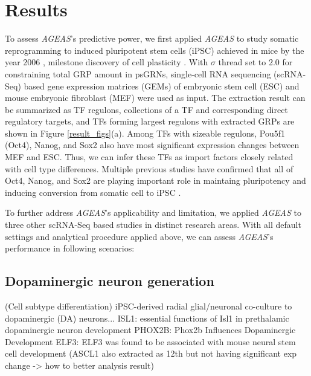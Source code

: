 \documentclass[fleqn,10pt]{wlscirep}
\begin{document}
\section*{Results}
  \label{res}
  To assess \emph{AGEAS}'s predictive power, we first applied \emph{AGEAS} to study somatic reprogramming to induced pluripotent stem cells (iPSC) achieved in mice by
  the year 2006 \cite{yamanaka_2006}, milestone discovery of cell plasticity \cite{cell_repro_review}.
  With $\sigma$ thread set to 2.0 for constraining total GRP amount in psGRNs, single-cell RNA sequencing (scRNA-Seq) based gene expression matrices (GEMs) of embryonic stem cell (ESC) and mouse embryonic fibroblast (MEF) were used as input.
  The extraction result can be summarized as TF regulons, collections of a TF and corresponding direct regulatory targets, and TFs forming largest regulons with extracted GRPs are shown in Figure \ref{result_figs}(a).
  Among TFs with sizeable regulons, Pou5f1 (Oct4), Nanog, and Sox2 also have most significant expression changes between MEF and ESC.
  Thus, we can infer these TFs as import factors closely related with cell type differences.
  Multiple previous studies have confirmed that all of Oct4, Nanog, and Sox2 are playing important role in maintaing pluripotency \cite{niwa_2007} and inducing conversion from somatic cell to iPSC \cite{yamanaka_2006, ips7f, ipsOK, oct4_nanog_sox2_lin28, oct4_nanog_sox2}.

  To further address \emph{AGEAS}'s applicability and limitation, we applied \emph{AGEAS} to three other scRNA-Seq based studies in distinct research areas.
  With all default settings and analytical procedure applied above, we can assess \emph{AGEAS}'s performance in following scenarios:

  \subsection*{Dopaminergic neuron generation}
  (Cell subtype differentiation)
  iPSC-derived radial glial/neuronal co-culture to dopaminergic (DA) neurons...
  ISL1: essential functions of Isl1 in prethalamic dopaminergic neuron development
  PHOX2B: Phox2b Influences Dopaminergic Development
  ELF3: ELF3 was found to be associated with mouse neural stem cell development
  (ASCL1 also extracted as 12th but not having significant exp change -> how to better analysis result)
\end{document}
